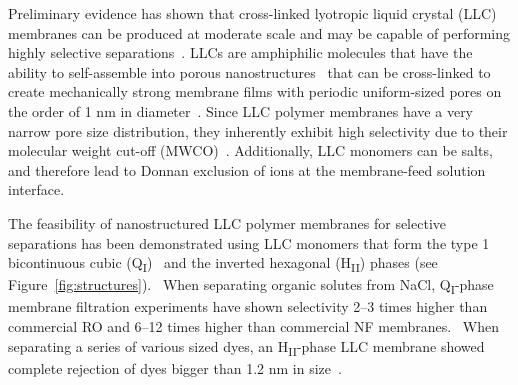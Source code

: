 \documentclass{article}
\begin{document}
  Preliminary evidence has shown that cross-linked lyotropic liquid crystal
  (LLC) membranes can be produced at moderate scale and may be capable of 
  performing highly selective separations~\cite{zhou_supported_2005,zhou_new_2007}. 
  LLCs are amphiphilic molecules that have the ability to self-assemble into
  porous nanostructures~\cite{smith_ordered_1997} that can be cross-linked 
  to create mechanically strong membrane films with periodic uniform-sized
  pores on the order of 1 nm in diameter~\cite{zhou_supported_2005}. 
  Since LLC polymer membranes have a very narrow pore size distribution, they 
  inherently exhibit high selectivity due to their molecular weight cut-off 
  (MWCO)~\cite{zhou_supported_2005}. Additionally, LLC monomers can be salts,
  and therefore lead to Donnan exclusion of ions at the membrane-feed solution 
  interface.\cite{donnan_theory_1995}

  The feasibility of nanostructured LLC polymer membranes for selective separations
  has been demonstrated using LLC monomers that form the type 1 bicontinuous cubic
  (Q\textsubscript{I})~\cite{hatakeyama_water_2011,hatakeyama_nanoporous_2010,carter_glycerol-based_2012}
  and the inverted hexagonal (H\textsubscript{II}) 
  phases (see Figure~\ref{fig:structures}).~\cite{zhou_supported_2005} When separating organic solutes from NaCl, Q\textsubscript{I}-phase
  membrane filtration experiments have shown selectivity 2--3 times higher than
  commercial RO and 6--12 times higher than commercial NF membranes.~\cite{dischinger_application_2017}
  When separating a series of various sized dyes, an H\textsubscript{II}-phase 
  LLC membrane showed complete rejection of dyes bigger than 1.2 nm in size~\cite{zhou_supported_2005}.

\end{document}
